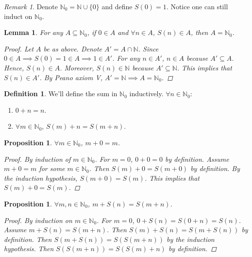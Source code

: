 \documentclass[10pt]{article}
\newcommand{\N}{\mathbb{N}}
\newtheorem{lemma}[theorem]{Lemma}
\newtheorem{proposition}[theorem]{Proposition}
\theoremstyle{definition}
\newtheorem{definition}[theorem]{Definition}
\theoremstyle{remark}
\newtheorem*{remark}{Remark}
\begin{document}
\begin{remark}
    Denote $\N_0 = \N \cup \{0\}$ and define $S(0) = 1$. Notice one can still induct on $\N_0$.
\end{remark}

\begin{lemma}
    For any $A \subseteq \N_0$, if $0 \in A$ and $\forall n \in  A$, $S(n) \in A$, then $A = \N_0$.
    \begin{proof}
        Let $A$ be as above. Denote $A' = A \cap \N$. Since $0 \in A \implies S(0) = 1 \in A \implies 1 \in A'$.
        For any $n \in A'$, $n \in A$ because $A' \subseteq A$. Hence, $S(n) \in A$.
        Moreover, $S(n) \in \N$ because $A' \subseteq \N$. This implies that $S(n) \in A'$. By Peano axiom V, $A' = \N \implies A = \N_0$.
    \end{proof}
\end{lemma}

\begin{definition}
    We'll define the sum in $\N_0$ inductively. $\forall n \in \N_0$:
    \begin{enumerate}
        \item $0 + n = n$.
        \item $\forall m \in \N_0$, $S(m) + n = S(m + n)$.
    \end{enumerate}
\end{definition}

\begin{proposition}
    $\forall m \in \N_0$, $m + 0 = m$.
    \begin{proof}
        By induction of $m \in \N_0$. For $m = 0$, $0 + 0 = 0$ by definition. Assume $m + 0 = m$ for some $m \in \N_0$.
        Then $S(m) + 0 = S(m + 0)$ by definition. By the induction hypothesis, $S(m + 0) = S(m)$. This implies that $S(m) + 0 = S(m)$.
    \end{proof}
\end{proposition}

\begin{proposition}
    $\forall m, n \in \N_0$, $m + S(n) = S(m + n)$.
    \begin{proof}
        By induction on $m \in \N_0$. For $m = 0$, $0 + S(n) = S(0 + n) = S(n)$.
        Assume $m + S(n) = S(m + n)$. Then $S(m) + S(n) = S(m + S(n))$ by definition.
        Then $S(m + S(n)) = S(S(m + n))$ by the induction hypothesis. 
        Then $S(S(m + n)) = S(S(m) + n)$ by definition. 
    \end{proof}
\end{proposition}
\end{document}
